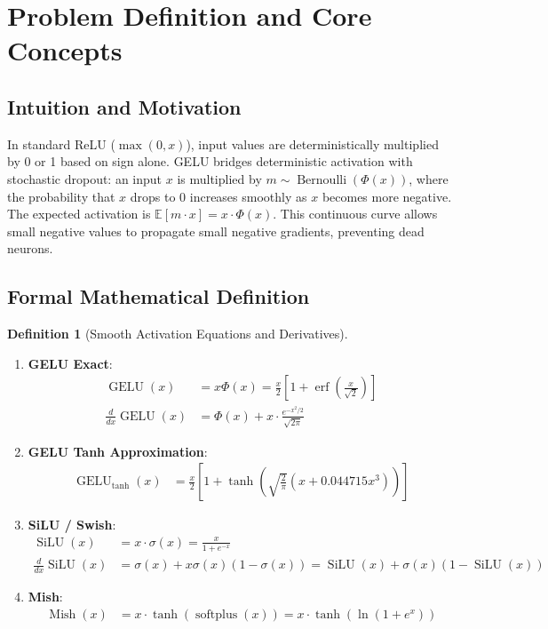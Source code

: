 \documentclass[11pt,a4paper]{article}
\theoremstyle{definition}
\newtheorem{definition}{Definition}[section]
\begin{document}
\section{Problem Definition and Core Concepts}

\subsection{Intuition and Motivation}
In standard ReLU ($\max(0, x)$), input values are deterministically multiplied by 0 or 1 based on sign alone. GELU bridges deterministic activation with stochastic dropout: an input $x$ is multiplied by $m \sim \operatorname{Bernoulli}(\Phi(x))$, where the probability that $x$ drops to 0 increases smoothly as $x$ becomes more negative. The expected activation is $\mathbb{E}[m \cdot x] = x \cdot \Phi(x)$. This continuous curve allows small negative values to propagate small negative gradients, preventing dead neurons.

\subsection{Formal Mathematical Definition}
\begin{definition}[Smooth Activation Equations and Derivatives]
\begin{enumerate}
    \item \textbf{GELU Exact}:
    \begin{align}
    \operatorname{GELU}(x) &= x \Phi(x) = \frac{x}{2} \left[ 1 + \operatorname{erf}\left( \frac{x}{\sqrt{2}} \right) \right] \label{eq:gelu_exact} \\
    \frac{d}{dx}\operatorname{GELU}(x) &= \Phi(x) + x \cdot \frac{e^{-x^2/2}}{\sqrt{2\pi}} \label{eq:gelu_grad}
    \end{align}
    \item \textbf{GELU Tanh Approximation}:
    \begin{align}
    \operatorname{GELU}_{\text{tanh}}(x) &= \frac{x}{2} \left[ 1 + \tanh\left( \sqrt{\frac{2}{\pi}} \left( x + 0.044715 x^3 \right) \right) \right] \label{eq:gelu_tanh}
    \end{align}
    \item \textbf{SiLU / Swish}:
    \begin{align}
    \operatorname{SiLU}(x) &= x \cdot \sigma(x) = \frac{x}{1 + e^{-x}} \label{eq:silu_def} \\
    \frac{d}{dx}\operatorname{SiLU}(x) &= \sigma(x) + x \sigma(x)(1 - \sigma(x)) = \operatorname{SiLU}(x) + \sigma(x)(1 - \operatorname{SiLU}(x)) \label{eq:silu_grad}
    \end{align}
    \item \textbf{Mish}:
    \begin{align}
    \operatorname{Mish}(x) &= x \cdot \tanh(\operatorname{softplus}(x)) = x \cdot \tanh(\ln(1 + e^x)) \label{eq:mish_def}
    \end{align}
\end{enumerate}
\end{definition}
\end{document}
